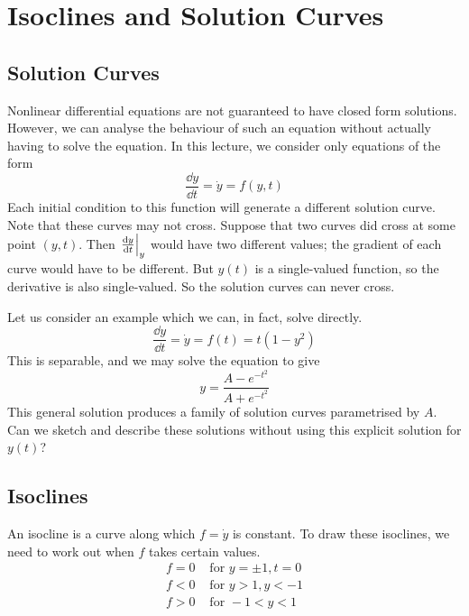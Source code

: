 \documentclass{article}
\begin{document}
\section{Isoclines and Solution Curves}
\subsection{Solution Curves}
Nonlinear differential equations are not guaranteed to have closed form solutions. However, we can analyse the behaviour of such an equation without actually having to solve the equation. In this lecture, we consider only equations of the form
\[ \frac{\dd{y}}{\dd{t}} = \dot y = f(y, t) \]
Each initial condition to this function will generate a different solution curve. Note that these curves may not cross. Suppose that two curves did cross at some point $(y, t)$. Then $\eval{\frac{\dd{y}}{\dd{t}}}_y$ would have two different values; the gradient of each curve would have to be different. But $y(t)$ is a single-valued function, so the derivative is also single-valued. So the solution curves can never cross.

Let us consider an example which we can, in fact, solve directly.
\[ \frac{\dd{y}}{\dd{t}} = \dot y = f(t) = t(1 - y^2) \]
This is separable, and we may solve the equation to give
\[ y = \frac{A - e^{-t^2}}{A + e^{-t^2}} \]
This general solution produces a family of solution curves parametrised by $A$. Can we sketch and describe these solutions without using this explicit solution for $y(t)$?

\subsection{Isoclines}
An isocline is a curve along which $f = \dot y$ is constant. To draw these isoclines, we need to work out when $f$ takes certain values.
\begin{align*}
    f = 0 & \text{ for } y = \pm 1, t = 0 \\
    f < 0 & \text{ for } y > 1, y < -1    \\
    f > 0 & \text{ for } -1 < y < 1
\end{align*}
\end{document}
